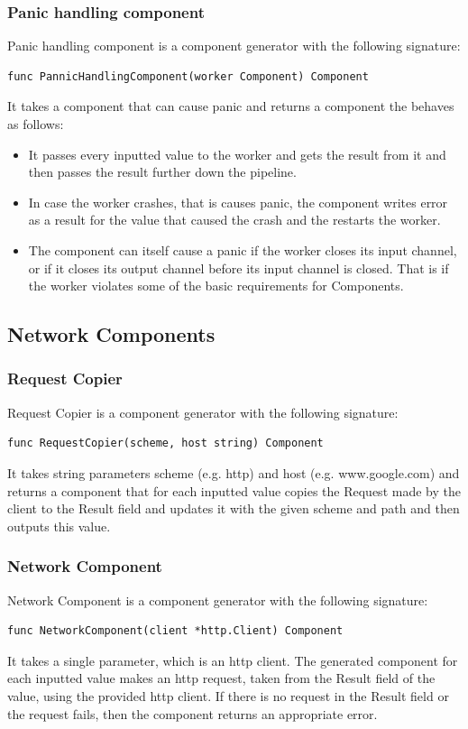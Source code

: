 \documentclass[12pt,a4paper]{article}
\begin{document}
\subsubsection{Panic handling component}
Panic handling component is a component generator with the following signature:

\begin{lstlisting}
func PannicHandlingComponent(worker Component) Component
\end{lstlisting}
It takes a component that can cause panic and returns a component the behaves as follows:
\begin{itemize}
	\item It passes every inputted value to the worker and gets the result from it and then passes
				the result further down the pipeline.
	\item In case the worker crashes, that is causes panic, the component writes error as a result 
				for the value that caused the crash and the restarts the worker.
	\item The component can itself cause a panic if the worker closes its input channel, or if 
				it closes its output channel before its input channel is closed. That is if the worker
				violates some of the basic requirements for Components.
\end{itemize}

\subsection{Network Components}
\subsubsection{Request Copier}
Request Copier is a component generator with the following signature:
\begin{lstlisting}
func RequestCopier(scheme, host string) Component
\end{lstlisting}
It takes string parameters scheme (e.g. http) and host (e.g. www.google.com) 
and returns a component that for each inputted value copies the Request made 
by the client to the Result field and updates it with the given scheme and 
path and then outputs this value.

\subsubsection{Network Component}
Network Component is a component generator with the following signature:
\begin{lstlisting}
func NetworkComponent(client *http.Client) Component
\end{lstlisting}
It takes a single parameter, which is an http client.
The generated component for each inputted value makes an http request,
taken from the Result field of the value, using the provided http client.
If there is no request in the Result field or the request fails, then
the component returns an appropriate error. 
\end{document}

